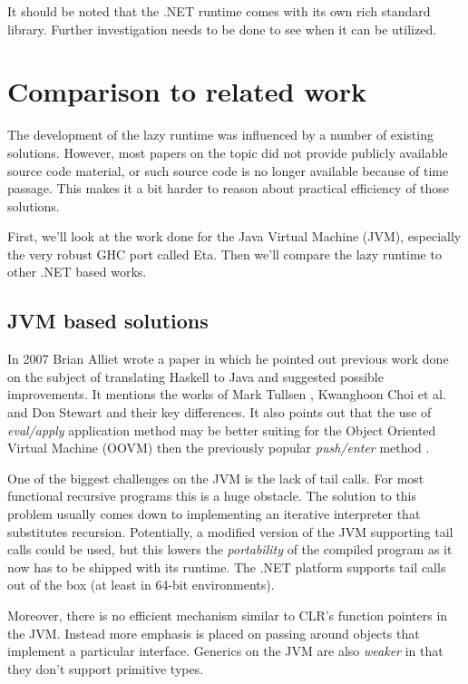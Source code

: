 \documentclass[en]{pracamgr}
\begin{document}
It should be noted that the .NET runtime comes with its own
rich standard library. Further investigation needs to be done
to see when it can be utilized.

\chapter{Comparison to related work}\label{r:alternatives}

The development of the lazy runtime was influenced by a
number of existing solutions. However, most papers on the
topic did not provide publicly available source code
material, or such source code is no longer available because
of time passage. This makes it a bit harder
to reason about practical efficiency of those solutions.

First, we'll look at the work done for the Java Virtual Machine (JVM),
especially the very robust GHC port called Eta.
Then we'll compare the lazy runtime to other .NET based works.

\section{JVM based solutions}

In 2007 Brian Alliet wrote a paper \cite{Alliet} in which
he pointed out previous work done on the subject of
translating Haskell to Java and suggested possible improvements.
It mentions the works of Mark Tullsen \cite{Tullsen},
Kwanghoon Choi et al. \cite{Choi}
and Don Stewart \cite{Stewart} and their key differences.
It also points out that the use of \textit{eval/apply} application method
may be better suiting for the Object Oriented Virtual Machine (OOVM)
then the previously popular \textit{push/enter} method
\cite{fastcurry}.

One of the biggest challenges on the JVM is the lack of
tail calls. For most functional recursive programs this
is a huge obstacle. The solution to this problem
usually comes down to implementing an iterative interpreter
that substitutes recursion.
Potentially, a modified version of the JVM supporting tail calls
could be used, but this lowers the \textit{portability} of the
compiled program as it now has to be shipped with its runtime.
The .NET platform supports tail calls out of the box
(at least in 64-bit environments).

Moreover, there is no efficient mechanism similar
to CLR's function pointers in the JVM.
Instead more emphasis is placed on passing around objects
that implement a particular interface.
Generics on the JVM are also \textit{weaker} in that they don't
support primitive types.
\end{document}
